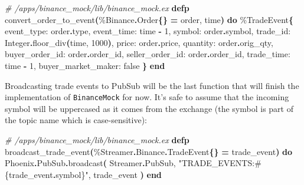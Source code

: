 \documentclass[
  oneside]{book}
\newenvironment{Shaded}{\begin{snugshade}}{\end{snugshade}}
\newcommand{\CommentTok}[1]{\textcolor[rgb]{0.56,0.35,0.01}{\textit{#1}}}
\newcommand{\ConstantTok}[1]{\textcolor[rgb]{0.56,0.35,0.01}{#1}}
\newcommand{\DecValTok}[1]{\textcolor[rgb]{0.00,0.00,0.81}{#1}}
\newcommand{\FunctionTok}[1]{\textcolor[rgb]{0.13,0.29,0.53}{\textbf{#1}}}
\newcommand{\KeywordTok}[1]{\textcolor[rgb]{0.13,0.29,0.53}{\textbf{#1}}}
\newcommand{\NormalTok}[1]{#1}
\newcommand{\OperatorTok}[1]{\textcolor[rgb]{0.81,0.36,0.00}{\textbf{#1}}}
\newcommand{\OtherTok}[1]{\textcolor[rgb]{0.56,0.35,0.01}{#1}}
\newcommand{\StringTok}[1]{\textcolor[rgb]{0.31,0.60,0.02}{#1}}
\newcommand{\VariableTok}[1]{\textcolor[rgb]{0.00,0.00,0.00}{#1}}
\begin{document}
\begin{Shaded}
\begin{Highlighting}[]
\CommentTok{\# /apps/binance\_mock/lib/binance\_mock.ex}
  \KeywordTok{defp}\NormalTok{ convert\_order\_to\_event}\FunctionTok{(}\NormalTok{\%}\ConstantTok{Binance}\OperatorTok{.}\ConstantTok{Order}\FunctionTok{\{\}} \OperatorTok{=}\NormalTok{ order, time}\FunctionTok{)} \KeywordTok{do}
\NormalTok{    \%}\ConstantTok{TradeEvent}\FunctionTok{\{}
      \VariableTok{event\_type:}\NormalTok{ order}\OperatorTok{.}\NormalTok{type,}
      \VariableTok{event\_time:}\NormalTok{ time }\OperatorTok{{-}} \DecValTok{1}\NormalTok{,}
      \VariableTok{symbol:}\NormalTok{ order}\OperatorTok{.}\NormalTok{symbol,}
      \VariableTok{trade\_id:} \ConstantTok{Integer}\OperatorTok{.}\NormalTok{floor\_div}\FunctionTok{(}\NormalTok{time, }\DecValTok{1000}\FunctionTok{)}\NormalTok{,}
      \VariableTok{price:}\NormalTok{ order}\OperatorTok{.}\NormalTok{price,}
      \VariableTok{quantity:}\NormalTok{ order}\OperatorTok{.}\NormalTok{orig\_qty,}
      \VariableTok{buyer\_order\_id:}\NormalTok{ order}\OperatorTok{.}\NormalTok{order\_id,}
      \VariableTok{seller\_order\_id:}\NormalTok{ order}\OperatorTok{.}\NormalTok{order\_id,}
      \VariableTok{trade\_time:}\NormalTok{ time }\OperatorTok{{-}} \DecValTok{1}\NormalTok{,}
      \VariableTok{buyer\_market\_maker:} \ConstantTok{false}
    \FunctionTok{\}}
  \KeywordTok{end}
\end{Highlighting}
\end{Shaded}

Broadcasting trade events to PubSub will be the last function that will finish
the implementation of \texttt{BinanceMock} for now. It's safe to assume that the incoming
symbol will be uppercased as it comes from the exchange (the symbol is part of the topic name which is case-sensitive):

\begin{Shaded}
\begin{Highlighting}[]
\CommentTok{\# /apps/binance\_mock/lib/binance\_mock.ex}
  \KeywordTok{defp}\NormalTok{ broadcast\_trade\_event}\FunctionTok{(}\NormalTok{\%}\ConstantTok{Streamer}\OperatorTok{.}\ConstantTok{Binance}\OperatorTok{.}\ConstantTok{TradeEvent}\FunctionTok{\{\}} \OperatorTok{=}\NormalTok{ trade\_event}\FunctionTok{)} \KeywordTok{do}
    \ConstantTok{Phoenix}\OperatorTok{.}\ConstantTok{PubSub}\OperatorTok{.}\NormalTok{broadcast}\FunctionTok{(}
      \ConstantTok{Streamer}\OperatorTok{.}\ConstantTok{PubSub}\NormalTok{,}
      \StringTok{"TRADE\_EVENTS:}\OtherTok{\#\{}\NormalTok{trade\_event}\OperatorTok{.}\NormalTok{symbol}\OtherTok{\}}\StringTok{"}\NormalTok{,}
\NormalTok{      trade\_event}
    \FunctionTok{)}
  \KeywordTok{end}
\end{Highlighting}
\end{Shaded}
\end{document}
